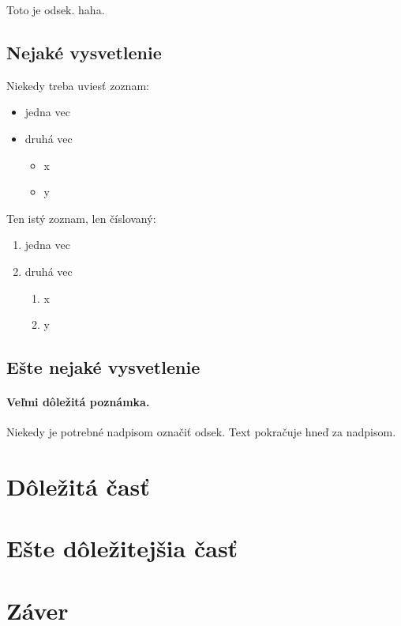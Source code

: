 \documentclass[11pt ,english,a4paper]{article}
\begin{document}
Toto je odsek. haha.

\subsection{Nejaké vysvetlenie} \label{ina:nejake}

Niekedy treba uviesť zoznam:

\begin{itemize}
\item jedna vec
\item druhá vec
	\begin{itemize}
	\item x
	\item y
	\end{itemize}
\end{itemize}

Ten istý zoznam, len číslovaný:

\begin{enumerate}
\item jedna vec
\item druhá vec
	\begin{enumerate}
	\item x
	\item y
	\end{enumerate}
\end{enumerate}


\subsection{Ešte nejaké vysvetlenie} \label{ina:este}

\paragraph{Veľmi dôležitá poznámka.}
Niekedy je potrebné nadpisom označiť odsek. Text pokračuje hneď za nadpisom.



\section{Dôležitá časť} \label{dolezita}




\section{Ešte dôležitejšia časť} \label{dolezitejsia}




\section{Záver} \label{zaver} %






\end{document}
